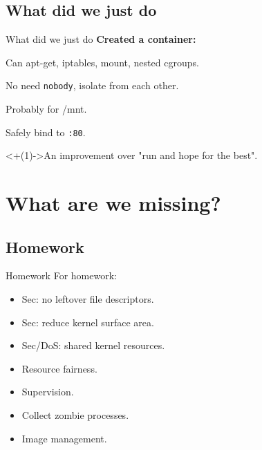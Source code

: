 \documentclass[14pt]{beamer}
\begin{document}
\subsection{What did we just do}
\begin{frame}{What did we just do}
    \relax
    {\bf Created a container:}
    \begin{description}[<+(1)->]
        \item[Fake root] Can apt-get, iptables, mount, nested cgroups.
        \item[Isolated pids] No need {\tt nobody}, isolate from each other.
        \item[Isolated mounts] Probably for /mnt.
        \item[Isolated network] Safely bind to {\tt :80}.
    \end{description}
    \onslide<+(1)->{An improvement over "run and hope for the best".}
\end{frame}

\section{What are we missing?}
\subsection{Homework}
\begin{frame}{Homework}
    For homework:
    \begin{itemize}[<+(1)->]
        \item Sec: no leftover file descriptors.
        \item Sec: reduce kernel surface area.
        \item Sec/DoS: shared kernel resources.
        \item Resource fairness.
        \item Supervision.
        \item Collect zombie processes.
        \item Image management.
    \end{itemize}
\end{frame}
\end{document}
